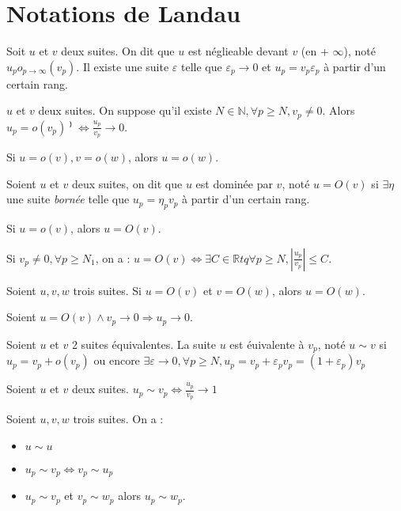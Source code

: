 \documentclass[french]{yLectureNote}
\newcommand{\N}[0]{\mathbb{N}}
\newcommand{\R}[0]{\mathbb{R}}
\begin{document}
\section{Notations de Landau}
\begin{definition}
Soit $u$ et $v$ deux suites. On dit que $u$ est néglieable devant $v$ (en + $\infty$), noté $u_p o_{p\to\infty} (v_p)$. Il existe une suite $\varepsilon$ telle que $\varepsilon_p\to 0$ et $u_p = v_p\varepsilon_p$ à partir d'un certain rang.
\end{definition}
\begin{proposition}
$u$ et $v$ deux suites. On suppose qu'il existe $N\in\N,\forall p\geq N, v_p\neq 0$. Alors $u_p = o(v_p)⁾ \iff \frac{u_p}{v_p}\to 0$.
\end{proposition}
\begin{proposition}
Si $u = o(v), v=o(w)$, alors $u=o(w)$.
\end{proposition}
\begin{definition}
Soient $u$ et $v$ deux suites, on dit que $u$ est dominée par $v$, noté $u = O(v)$ si $\exists \eta $ une suite \emph{bornée} telle que $u_p = \eta_pv_p$ à partir d'un certain rang.
\end{definition}
\begin{proposition}
Si $u = o(v)$, alors $u=O(v)$.
\end{proposition}
\begin{proposition}
Si $v_p \neq 0, \forall p\geq N_1$, on a :
$u = O(v)  \iff \exists C \in\R tq \forall p\geq N, |\frac{u_p}{v_p}| \leq C$.
\end{proposition}
\begin{proposition}
Soient $u,v,w$ trois suites. Si $u=O(v)$ et $v=O(w)$, alors $u=O(w)$.
\end{proposition}
\begin{proposition}
Soient $u = O(v) \wedge v_p\to 0 \Rightarrow u_p\to 0$.
\end{proposition}
\begin{definition}
Soient $u$ et $v$ 2 suites équivalentes. La suite $u$ est éuivalente à $v_p$, noté $u\sim v$ si $u_p = v_p + o(v_p)$ ou encore $\exists \varepsilon \to 0, \forall p\geq N, u_p = v_p + \varepsilon_pv_p = (1+\varepsilon_p)v_p$
\end{definition}
\begin{proposition}
Soient $u$ et $v$ deux suites. $u_p \sim v_p \iff \frac{u_p}{v_p} \to 1$
\end{proposition}
\begin{proposition}
Soient $u,v,w$ trois suites. On a :
\begin{itemize}
 \item $u\sim u$
 \item $u_p \sim v_p \iff v_p\sim u_p$
 \item $u_p\sim v_p$ et $v_p\sim w_p$ alors $u_p\sim w_p$.
\end{itemize}
\end{proposition}
\end{document}
